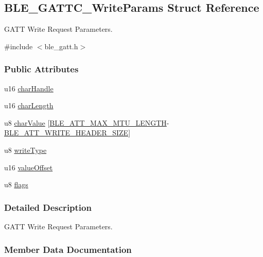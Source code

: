 \hypertarget{struct_b_l_e___g_a_t_t_c___write_params}{}\subsection{B\+L\+E\+\_\+\+G\+A\+T\+T\+C\+\_\+\+Write\+Params Struct Reference}
\label{struct_b_l_e___g_a_t_t_c___write_params}


G\+A\+TT Write Request Parameters.  




{\ttfamily \#include $<$ble\+\_\+gatt.\+h$>$}

\subsubsection*{Public Attributes}
\begin{DoxyCompactItemize}
\item 
u16 \hyperlink{struct_b_l_e___g_a_t_t_c___write_params_a293a46eab3ac35723d8106aefa34e001}{char\+Handle}
\item 
u16 \hyperlink{struct_b_l_e___g_a_t_t_c___write_params_ac34bdb23d802323b6e6b700a8bc375e0}{char\+Length}
\item 
u8 \hyperlink{struct_b_l_e___g_a_t_t_c___write_params_ab31b91ce2e480a2adc11a37abc50f6e4}{char\+Value} \mbox{[}\hyperlink{group___b_l_e___g_a_t_t_ga380151ce5e77dadfae069f37afd70b8b}{B\+L\+E\+\_\+\+A\+T\+T\+\_\+\+M\+A\+X\+\_\+\+M\+T\+U\+\_\+\+L\+E\+N\+G\+TH}-\/\hyperlink{group___b_l_e___g_a_t_t_ga433fb9d859cdfa9d22acf4c6af69e1a3}{B\+L\+E\+\_\+\+A\+T\+T\+\_\+\+W\+R\+I\+T\+E\+\_\+\+H\+E\+A\+D\+E\+R\+\_\+\+S\+I\+ZE}\mbox{]}
\item 
u8 \hyperlink{struct_b_l_e___g_a_t_t_c___write_params_a449609583fc6fcbc7c2015e8a0504a95}{write\+Type}
\item 
u16 \hyperlink{struct_b_l_e___g_a_t_t_c___write_params_a70cea5a1c48f5bb99750fa8a4ce9e539}{value\+Offset}
\item 
u8 \hyperlink{struct_b_l_e___g_a_t_t_c___write_params_a31c45974bba26b865efd808329baf848}{flags}
\end{DoxyCompactItemize}


\subsubsection{Detailed Description}
G\+A\+TT Write Request Parameters. 

\subsubsection{Member Data Documentation}
